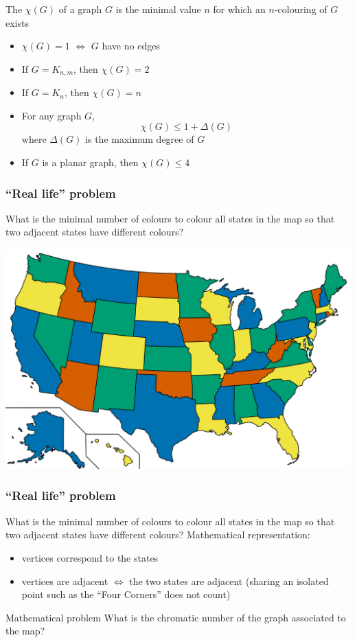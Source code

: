 \documentclass[aspectratio=43]{beamer}
\begin{document}
\begin{frame}
\begin{definition}
The  $\chi (G)$ of a graph $G$ is the minimal value $n$ for which an $n$-colouring of $G$ exists
\end{definition}
\vfill
\begin{property}
\begin{itemize}
\item $\chi (G)=1$ $\iff$ $G$ have no edges
\item If $G=K_{n,m}$, then $\chi(G)=2$
\item If $G=K_n$, then $\chi(G)=n$
\item For any graph $G$, $$\chi (G)\leq 1+ \Delta (G)$$
where $\Delta (G)$ is the maximum degree of $G$
\item If $G$ is a planar graph, then $\chi(G) \leq 4$
\end{itemize}
\end{property}
\end{frame}


\begin{frame}\frametitle{``Real life'' problem}
What is the minimal number of colours to colour all states in the map so that two adjacent states have different colours?
\begin{center}
\includegraphics[width=.85\textwidth]{FIGS_slides/USA-4-colours}
\end{center}\end{frame}

\begin{frame}\frametitle{``Real life'' problem}
	What is the minimal number of colours to colour all states in the map so that two adjacent states have different colours?
	\vfill
Mathematical representation:
\begin{itemize}
\item vertices correspond to the states
\item vertices are adjacent $\iff$ the two states are adjacent (sharing an isolated point such as the ``Four Corners'' does not count)
\end{itemize}
\vfill
\begin{block}{Mathematical problem}
What is the chromatic number of the graph associated to the map?
\end{block}
\end{frame}
\end{document}

